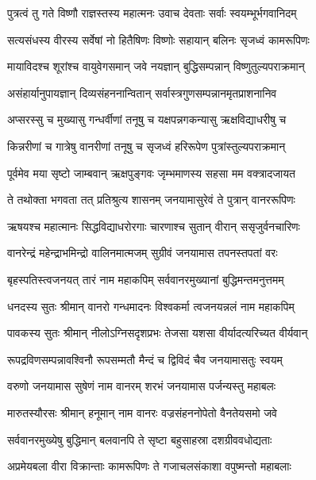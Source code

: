 
\twolineshloka
{पुत्रत्वं तु गते विष्णौ राज्ञस्तस्य महात्मनः}
{उवाच देवताः सर्वाः स्वयम्भूर्भगवानिदम्} %

\twolineshloka
{सत्यसंधस्य वीरस्य सर्वेषां नो हितैषिणः}
{विष्णोः सहायान् बलिनः सृजध्वं कामरूपिणः} %

\twolineshloka
{मायाविदश्च शूरांश्च वायुवेगसमान् जवे}
{नयज्ञान् बुद्धिसम्पन्नान् विष्णुतुल्यपराक्रमान्} %

\twolineshloka
{असंहार्यानुपायज्ञान् दिव्यसंहननान्वितान्}
{सर्वास्त्रगुणसम्पन्नानमृतप्राशनानिव} %

\twolineshloka
{अप्सरस्सु च मुख्यासु गन्धर्वीणां तनूषु च}
{यक्षपन्नगकन्यासु ऋक्षविद्याधरीषु च} %

\twolineshloka
{किन्नरीणां च गात्रेषु वानरीणां तनूषु च}
{सृजध्वं हरिरूपेण पुत्रांस्तुल्यपराक्रमान्} %

\twolineshloka
{पूर्वमेव मया सृष्टो जाम्बवान् ऋक्षपुङ्गवः}
{जृम्भमाणस्य सहसा मम वक्त्रादजायत} %

\twolineshloka
{ते तथोक्ता भगवता तत् प्रतिश्रुत्य शासनम्}
{जनयामासुरेवं ते पुत्रान् वानररूपिणः} %

\twolineshloka
{ऋषयश्च महात्मानः सिद्धविद्याधरोरगाः}
{चारणाश्च सुतान् वीरान् ससृजुर्वनचारिणः} %

\twolineshloka
{वानरेन्द्रं महेन्द्राभमिन्द्रो वालिनमात्मजम्}
{सुग्रीवं जनयामास तपनस्तपतां वरः} %

\twolineshloka
{बृहस्पतिस्त्वजनयत् तारं नाम महाकपिम्}
{सर्ववानरमुख्यानां बुद्धिमन्तमनुत्तमम्} %

\twolineshloka
{धनदस्य सुतः श्रीमान् वानरो गन्धमादनः}
{विश्वकर्मा त्वजनयन्नलं नाम महाकपिम्} %

\twolineshloka
{पावकस्य सुतः श्रीमान् नीलोऽग्निसदृशप्रभः}
{तेजसा यशसा वीर्यादत्यरिच्यत वीर्यवान्} %

\twolineshloka
{रूपद्रविणसम्पन्नावश्विनौ रूपसम्मतौ}
{मैन्दं च द्विविदं चैव जनयामासतुः स्वयम्} %

\twolineshloka
{वरुणो जनयामास सुषेणं नाम वानरम्}
{शरभं जनयामास पर्जन्यस्तु महाबलः} %

\twolineshloka
{मारुतस्यौरसः श्रीमान् हनूमान् नाम वानरः}
{वज्रसंहननोपेतो वैनतेयसमो जवे} %

\twolineshloka
{सर्ववानरमुख्येषु बुद्धिमान् बलवानपि}
{ते सृष्टा बहुसाहस्रा दशग्रीववधोद्यताः} %

\twolineshloka
{अप्रमेयबला वीरा विक्रान्ताः कामरूपिणः}
{ते गजाचलसंकाशा वपुष्मन्तो महाबलाः} %

